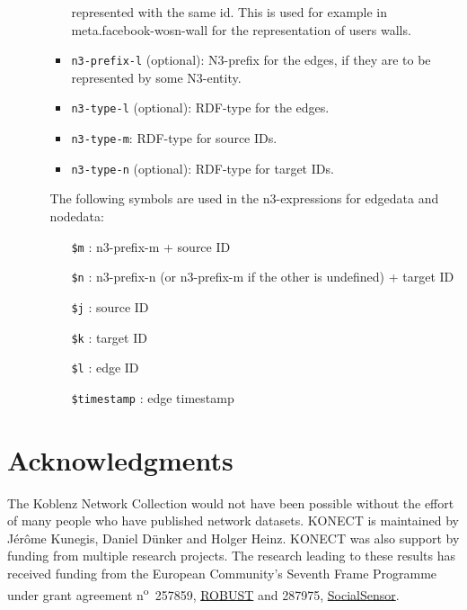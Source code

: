 \documentclass{article}
\begin{document}
\begin{itemize}
\begin{itemize}
\begin{itemize}
                          represented with the same id. This is used for
                          example in meta.facebook-wosn-wall for the
                          representation of users walls.
			\item \texttt{n3-prefix-l} (optional): N3-prefix
                          for the edges, if they are to be represented
                          by some N3-entity.
			\item \texttt{n3-type-l} (optional): RDF-type
                          for the edges.
			\item \texttt{n3-type-m}: RDF-type for source
                          IDs.
			\item \texttt{n3-type-n} (optional): RDF-type
                          for target IDs.
		\end{itemize}
		The following symbols are used in the n3-expressions for
                edgedata and nodedata:
		\begin{itemize}
			\item[\texttt{\$m}]: n3-prefix-m + source ID
			\item[\texttt{\$n}]: n3-prefix-n (or n3-prefix-m
                          if the other is undefined) + target ID
			\item[\texttt{\$j}]: source ID
			\item[\texttt{\$k}]: target ID
			\item[\texttt{\$l}]: edge ID
			\item[\texttt{\$timestamp}]: edge timestamp
		\end{itemize}
    \end{itemize}
\end{itemize}

\section*{Acknowledgments}
The Koblenz Network Collection would not have been possible without the
effort of many people who have published network datasets.  
KONECT is maintained by Jérôme Kunegis, Daniel Dünker and Holger Heinz.    
KONECT was also support by funding from multiple research projects. 
The research leading to
these results has received funding from the European Community's Seventh
Frame Programme under grant agreement n\textsuperscript{o}~257859,
\href{http://robust-project.eu/}{ROBUST} and 287975,
\href{http://www.socialsensor.eu/}{SocialSensor}. 



\end{document}
